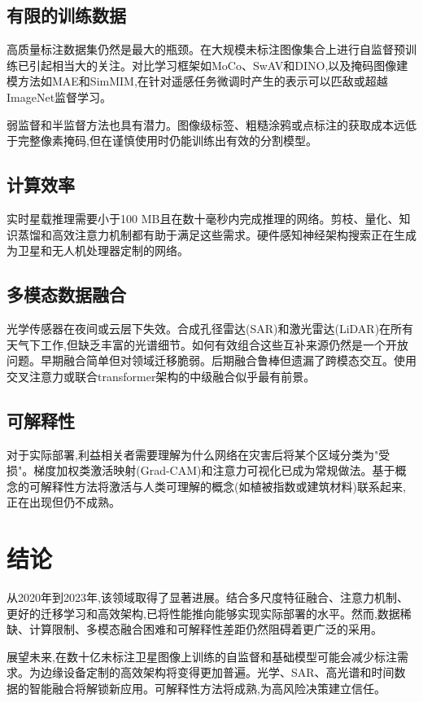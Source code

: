 \documentclass[12pt,a4paper]{article}
\begin{document}
\subsection{有限的训练数据}
高质量标注数据集仍然是最大的瓶颈。在大规模未标注图像集合上进行自监督预训练已引起相当大的关注。对比学习框架如MoCo、SwAV和DINO,以及掩码图像建模方法如MAE和SimMIM,在针对遥感任务微调时产生的表示可以匹敌或超越ImageNet监督学习。

弱监督和半监督方法也具有潜力。图像级标签、粗糙涂鸦或点标注的获取成本远低于完整像素掩码,但在谨慎使用时仍能训练出有效的分割模型。

\subsection{计算效率}
实时星载推理需要小于100 MB且在数十毫秒内完成推理的网络。剪枝、量化、知识蒸馏和高效注意力机制都有助于满足这些需求。硬件感知神经架构搜索正在生成为卫星和无人机处理器定制的网络。

\subsection{多模态数据融合}
光学传感器在夜间或云层下失效。合成孔径雷达(SAR)和激光雷达(LiDAR)在所有天气下工作,但缺乏丰富的光谱细节。如何有效组合这些互补来源仍然是一个开放问题。早期融合简单但对领域迁移脆弱。后期融合鲁棒但遗漏了跨模态交互。使用交叉注意力或联合transformer架构的中级融合似乎最有前景。

\subsection{可解释性}
对于实际部署,利益相关者需要理解为什么网络在灾害后将某个区域分类为"受损"。梯度加权类激活映射(Grad-CAM)和注意力可视化已成为常规做法。基于概念的可解释性方法将激活与人类可理解的概念(如植被指数或建筑材料)联系起来,正在出现但仍不成熟。

\section{结论}
\label{sec:conclusion}
从2020年到2023年,该领域取得了显著进展。结合多尺度特征融合、注意力机制、更好的迁移学习和高效架构,已将性能推向能够实现实际部署的水平。然而,数据稀缺、计算限制、多模态融合困难和可解释性差距仍然阻碍着更广泛的采用。

展望未来,在数十亿未标注卫星图像上训练的自监督和基础模型可能会减少标注需求。为边缘设备定制的高效架构将变得更加普遍。光学、SAR、高光谱和时间数据的智能融合将解锁新应用。可解释性方法将成熟,为高风险决策建立信任。
\end{document}
